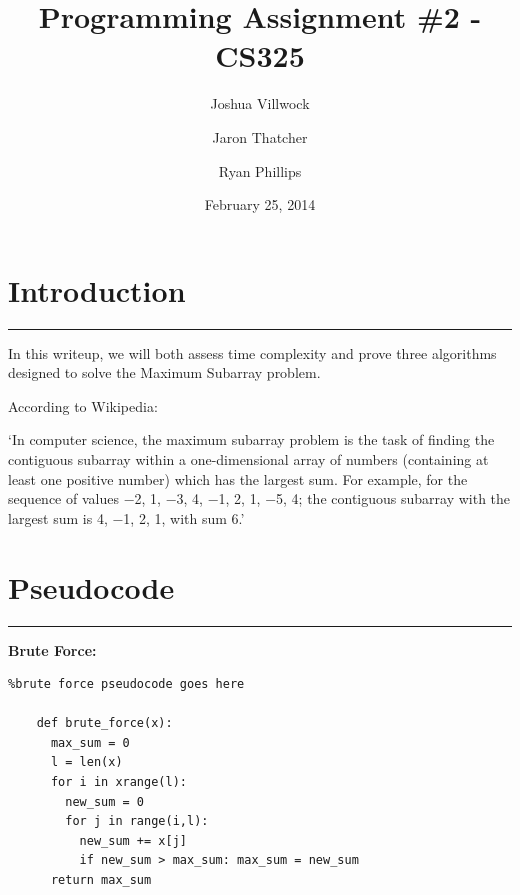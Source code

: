 \documentclass[letterpaper,10pt,titlepage,fleqn]{article}
\begin{document}
\lstset{language=Python} 

\title{Programming Assignment \#2 - CS325}

\author{
	Joshua Villwock \and
	Jaron Thatcher \and
	Ryan Phillips
}

\date{February 25, 2014}
\maketitle







\section*{Introduction}
\hrule

In this writeup, we will both assess time complexity and prove three algorithms designed to solve the Maximum Subarray problem. 
\par

According to Wikipedia:

\par

`In computer science, the maximum subarray problem is the task of finding the contiguous subarray within a one-dimensional array of numbers (containing at least one positive number) which has the largest sum. For example, for the sequence of values −2, 1, −3, 4, −1, 2, 1, −5, 4; the contiguous subarray with the largest sum is 4, −1, 2, 1, with sum 6.'

\section*{Pseudocode}
\hrule
\begin{centering}

    \textbf{Brute Force:}
    \end{centering}
    \begin{lstlisting}%brute force pseudocode goes here

    def brute_force(x): 
      max_sum = 0
      l = len(x)
      for i in xrange(l):
        new_sum = 0
        for j in range(i,l):
          new_sum += x[j] 
          if new_sum > max_sum: max_sum = new_sum
      return max_sum

    \end{lstlisting}
\end{document}
